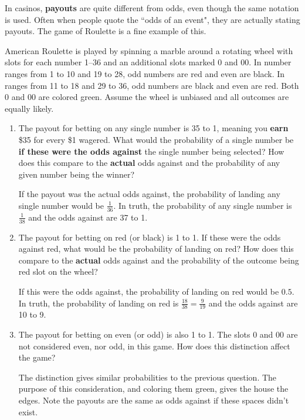 \documentclass{ccg-topic}
\begin{document}
    \begin{todo}[Roulette]
        \label{todo:roulette}
        In casinos, \textbf{payouts} are quite different from odds, even though the same notation is used. Often when people quote the ``odds of an event", they are actually stating payouts. The game of Roulette is a fine example of this.
        
        American Roulette is played by spinning a marble around a rotating wheel with slots for each number 1--36 and an additional slots marked 0 and 00. In number ranges from 1 to 10 and 19 to 28, odd numbers are red and even are black. In ranges from 11 to 18 and 29 to 36, odd numbers are black and even are red. Both 0 and 00 are colored green. Assume the wheel is unbiased and all outcomes are equally likely.
        
            \begin{enumerate}
        
            \item The payout for betting on any single number is 35 to 1, meaning you \textbf{earn} \$35 for every \$1 wagered. What would the probability of a single number be \textbf{if these were the odds against} the single number being selected? How does this compare to the \textbf{actual} odds against and the probability of any given number being the winner?
        
            {\answer If the payout was the actual odds against, the probability of landing any single number would be $\frac{1}{36}$. In truth, the probability of any single number is $\frac{1}{38}$ and the odds against are 37 to 1.}
        
            \vfill
        
            \item The payout for betting on red (or black) is 1 to 1. If these were the odds against red, what would be the probability of landing on red? How does this compare to the \textbf{actual} odds against and the probability of the outcome being red slot on the wheel?
        
            {\answer If this were the odds against, the probability of landing on red would be $0.5$. In truth, the probability of landing on red is $\frac{18}{38}=\frac{9}{19}$ and the odds against are 10 to 9.}
        
            \vfill
        
            \item The payout for betting on even (or odd) is also 1 to 1. The slots 0 and 00 are not considered even, nor odd, in this game. How does this distinction affect the game? 
        
            {\answer The distinction gives similar probabilities to the previous question. The purpose of this consideration, and coloring them green, gives the house the edges. Note the payouts are the same as odds against if these spaces didn't exist.}
        
            \end{enumerate}
    \end{todo}
    
\end{document}
